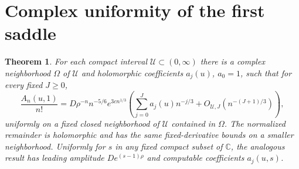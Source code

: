 \documentclass[11pt]{article}
\newtheorem{theorem}{Theorem}[section]
\theoremstyle{remark}\newtheorem{remark}[theorem]{Remark}
\begin{document}
\section{Complex uniformity of the first saddle}\label{vav:rf:sec:first}
\begin{theorem}\label{vav:rf:thm:first}
For each compact interval $\mathcal U\subset(0,\infty)$ there is a complex neighborhood $\Omega$ of $\mathcal U$ and holomorphic coefficients $a_j(u)$, $a_0=1$, such that for every fixed $J\ge0$,
\begin{equation}\label{vav:rf:eq:first}
 \frac{A_n(u,1)}{n!}
 =D\rho^{-n}n^{-5/6}e^{3cn^{1/3}}
 \left(\sum_{j=0}^J a_j(u)n^{-j/3}+O_{\mathcal U,J}(n^{-(J+1)/3})\right),
\end{equation}
uniformly on a fixed closed neighborhood of $\mathcal U$ contained in $\Omega$.
The normalized remainder is holomorphic and has the same fixed-derivative bounds on a smaller neighborhood. Uniformly for $s$ in any fixed compact subset of $\mathbb C$, the analogous result has leading amplitude $D e^{(s-1)\rho}$ and computable coefficients $a_j(u,s)$.
\end{theorem}
\end{document}
